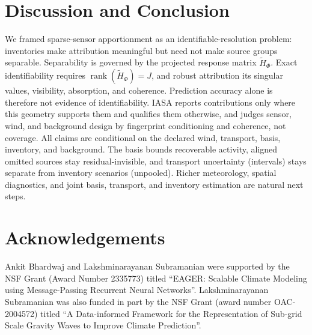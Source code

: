 \section{Discussion and Conclusion}
\label{sec:discussion_conclusion}

We framed sparse-sensor apportionment as an identifiable-resolution problem:
inventories make attribution meaningful but need not make source groups separable.
Separability is governed by the projected response matrix \(\widetilde H_\Phi\).
Exact identifiability requires \(\operatorname{rank}(\widetilde H_\Phi)=J\), and
robust attribution its singular values, visibility, absorption, and coherence.
Prediction accuracy alone is therefore not evidence of identifiability.  IASA reports
contributions only where this geometry supports them and qualifies them otherwise,
and judges sensor, wind, and background design by fingerprint conditioning and
coherence, not coverage.  All claims are conditional on the
declared wind, transport, basis, inventory, and background.  The basis bounds
recoverable activity, aligned omitted sources stay residual-invisible, and
transport uncertainty (intervals) stays separate from inventory scenarios
(unpooled).  Richer meteorology, spatial diagnostics, and joint basis, transport,
and inventory estimation are natural next steps.

\section*{Acknowledgements}
Ankit Bhardwaj and Lakshminarayanan Subramanian were supported by the NSF Grant (Award Number 2335773) titled ``EAGER: Scalable Climate Modeling using Message-Passing Recurrent Neural Networks''. Lakshminarayanan Subramanian was also funded in part by the NSF Grant (award number OAC-2004572) titled ``A Data-informed Framework for the Representation of Sub-grid Scale Gravity Waves to Improve Climate Prediction''.
